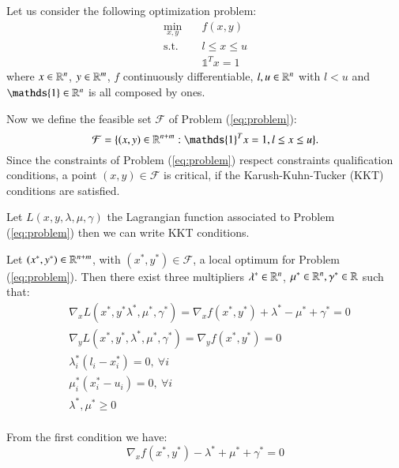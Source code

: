Let us consider the following optimization problem:
\begin{subequations}\label{eq:problem} 
\begin{align}
\min_{x,y} & \quad f(x,y)  \\
\text{s.t.} & \quad l \leq x \leq u \\
& \quad \mathds{1}^T x = 1 
\end{align}
\end{subequations}
where $x \in \mathbb{R}^n$, $y \in \mathbb{R}^m$, $f$ continuously differentiable, $l, u \in \mathbb{R}^n$ with $l < u$ and $\mathds{1} \in \R^n$ is all composed by ones. 

Now we define the feasible set $\mathcal{F}$  of Problem (\ref{eq:problem}):
\begin{equation}
\mathcal{F} = \{(x,y) \in \R^{n+m} : \mathds{1}^T x = 1, l \leq x \leq u\}.
\end{equation}
Since the constraints of Problem (\ref{eq:problem}) respect constraints qualification conditions, a point $(x,y) \in \mathcal{F}$ is critical, if the Karush-Kuhn-Tucker (KKT) conditions are satisfied.

Let $L(x,y,\lambda,\mu,\gamma)$ the Lagrangian function associated to Problem (\ref{eq:problem}) then we can write KKT conditions.

\begin{proposition}\label{prop:KKT}

Let $(x^*,y^*) \in \mathbb{R}^{n+m}$, with $(x^*,y^*) \in \mathcal{F}$, a local optimum for Problem (\ref{eq:problem}). Then there exist three multipliers $\lambda^* \in \mathbb{R}^n$, $\mu^* \in \mathbb{R}^n, \gamma^* \in \mathbb{R}$ such that:
\begin{equation}
 \begin{aligned}
  &\nabla_x L(x^*,y^*\lambda^*,\mu^*,\gamma^*)= \nabla_x f(x^*,y^*)+\lambda^*-\mu^*+\gamma^*=0\\
 &\nabla_y L(x^*,y^*,\lambda^*,\mu^*,\gamma^*)=\nabla_y f(x^*,y^*) =0 \\
    &\lambda^*_i(l_i-x_i^*)=0,\ \forall i\\
 &\mu^*_i(x_i^*-u_i)=0,\ \forall i\\
   & \lambda^*,\mu^*\ge0 \\
 \end{aligned}
\end{equation}
\end{proposition}

From the first condition we have:
\begin{equation}
 \nabla_x f(x^*,y^*)-\lambda^*+\mu^*+\gamma^*=0
\end{equation}

